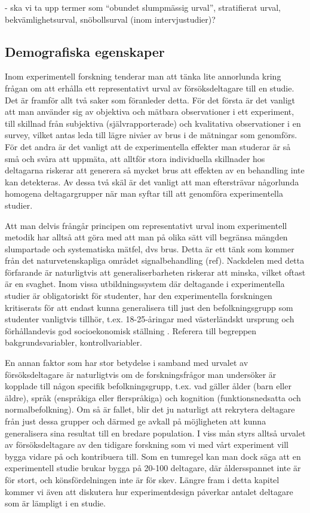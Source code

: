 \documentclass[
]{book}
\begin{document}
- ska vi ta upp termer som ``obundet slumpmässig urval'', stratifierat urval, bekvämlighetsurval, snöbollsurval (inom intervjustudier)?

\hypertarget{sub07.2.2}{%
\subsection{Demografiska egenskaper}\label{sub07.2.2}}

Inom experimentell forskning tenderar man att tänka lite annorlunda kring frågan om att erhålla ett representativt urval av försöksdeltagare till en studie. Det är framför allt två saker som föranleder detta. För det första är det vanligt att man använder sig av objektiva och mätbara observationer i ett experiment, till skillnad från subjektiva (självrapporterade) och kvalitativa observationer i en survey, vilket antas leda till lägre nivåer av brus i de mätningar som genomförs. För det andra är det vanligt att de experimentella effekter man studerar är så små och svåra att uppmäta, att alltför stora individuella skillnader hos deltagarna riskerar att generera så mycket brus att effekten av en behandling inte kan detekteras. Av dessa två skäl är det vanligt att man eftersträvar någorlunda homogena deltagargrupper när man syftar till att genomföra experimentella studier.

Att man delvis frångår principen om representativt urval inom experimentell metodik har alltså att göra med att man på olika sätt vill begränsa mängden slumpartade och systematiska mätfel, dvs brus. Detta är ett tänk som kommer från det naturvetenskapliga området signalbehandling (ref). Nackdelen med detta förfarande är naturligtvis att generaliserbarheten riskerar att minska, vilket oftast är en svaghet. Inom vissa utbildningssystem där deltagande i experimentella studier är obligatoriskt för studenter, har den experimentella forskningen kritiserats för att endast kunna generalisera till just den befolkningsgrupp som studenter vanligtvis tillhör, t.ex. 18-25-åringar med västerländskt ursprung och förhållandevis god socioekonomisk ställning \citep{henrich2010weirdest}. Referera till begreppen bakgrundsvariabler, kontrollvariabler.

En annan faktor som har stor betydelse i samband med urvalet av försöksdeltagare är naturligtvis om de forskningsfrågor man undersöker är kopplade till någon specifik befolkningsgrupp, t.ex. vad gäller ålder (barn eller äldre), språk (enspråkiga eller flerspråkiga) och kognition (funktionsnedsatta och normalbefolkning). Om så är fallet, blir det ju naturligt att rekrytera deltagare från just dessa grupper och därmed ge avkall på möjligheten att kunna generalisera sina resultat till en bredare population. I viss mån styrs alltså urvalet av försöksdeltagare av den tidigare forskning som vi med vårt experiment vill bygga vidare på och kontribuera till. Som en tumregel kan man dock säga att en experimentell studie brukar bygga på 20-100 deltagare, där åldersspannet inte är för stort, och könsfördelningen inte är för skev. Längre fram i detta kapitel kommer vi även att diskutera hur experimentdesign påverkar antalet deltagare som är lämpligt i en studie.
\end{document}
